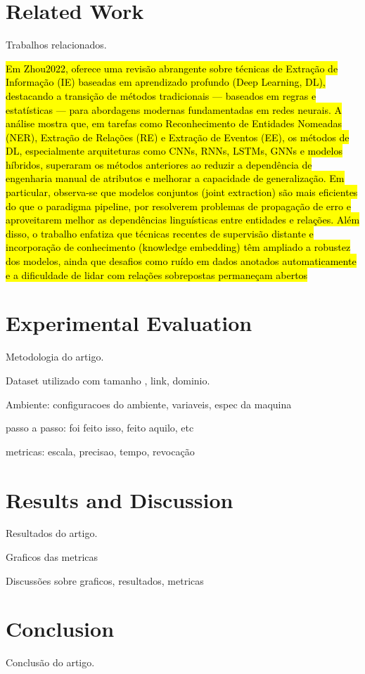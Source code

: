 \documentclass[sigconf]{acmart}
\newcommand{\pending}[1]{\hl{#1}} %
\begin{document}
\section{Related Work}
Trabalhos relacionados.


\pending{
  Em Zhou2022, oferece uma revisão abrangente sobre técnicas de Extração de Informação (IE) baseadas em aprendizado profundo (Deep Learning, DL), destacando a transição de métodos tradicionais — baseados em regras e estatísticas — para abordagens modernas fundamentadas em redes neurais. A análise mostra que, em tarefas como Reconhecimento de Entidades Nomeadas (NER), Extração de Relações (RE) e Extração de Eventos (EE), os métodos de DL, especialmente arquiteturas como CNNs, RNNs, LSTMs, GNNs e modelos híbridos, superaram os métodos anteriores ao reduzir a dependência de engenharia manual de atributos e melhorar a capacidade de generalização. 
  Em particular, observa-se que modelos conjuntos (joint extraction) são mais eficientes do que o paradigma pipeline, por resolverem problemas de propagação de erro e aproveitarem melhor as dependências linguísticas entre entidades e relações. Além disso, o trabalho enfatiza que técnicas recentes de supervisão distante e incorporação de conhecimento (knowledge embedding) têm ampliado a robustez dos modelos, ainda que desafios como ruído em dados anotados automaticamente e a dificuldade de lidar com relações sobrepostas permaneçam abertos  
}\cite{Zhou2022}


\section{Experimental Evaluation}
Metodologia do artigo.

Dataset utilizado com tamanho , link, dominio.

Ambiente: configuracoes do ambiente, variaveis, espec da maquina

passo a passo: foi feito isso, feito aquilo, etc

metricas: escala, precisao, tempo, revocação

\section{Results and Discussion}
Resultados do artigo.

Graficos das metricas

Discussões sobre graficos, resultados, metricas


\section{Conclusion}
Conclusão do artigo.
\end{document}

